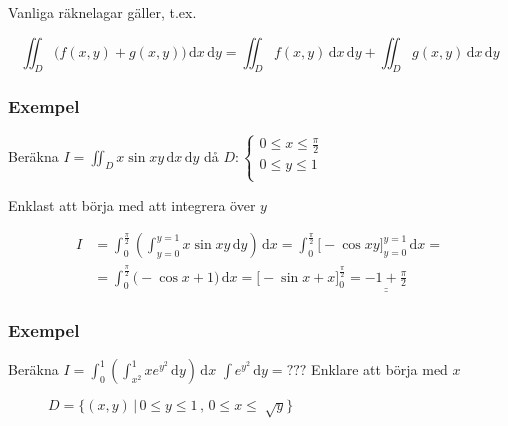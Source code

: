 \documentclass[a4paper]{article}
\newcommand{\svar}[1]{\underline{\underline{#1}}}
\let\oldsqrt\sqrt
\renewcommand*{\sqrt}[2][\ ]{\oldsqrt[#1]{#2} }
\begin{document}
Vanliga räknelagar gäller, t.ex.

$$
	\iint_D \Big(f(x,y)+g(x,y)\Big) \,\mathrm{d}x\,\mathrm{d}y = \iint_D f(x,y) \,\mathrm{d}x\,\mathrm{d}y + \iint_D g(x,y) \,\mathrm{d}x\,\mathrm{d}y
$$

\newpage
\subsubsection{Exempel}
Beräkna $I = \iint_D x\sin{xy} \,\mathrm{d}x\,\mathrm{d}y$   då $D:
\begin{cases}
	0 \leq x \leq \frac{\pi}{2} \\
	0 \leq y \leq 1 \\
\end{cases}$

Enklast att börja med att integrera över $y$

\begin{align*}
	I &= \int_0^{\frac{\pi}{2}} \left(\int_{y=0}^{y=1} x\sin{xy} \,\mathrm{d}y \right) \,\mathrm{d}x = \int_0^{\frac{\pi}{2}} \Bigg[ -\cos{xy} \Bigg]_{y=0}^{y=1} \,\mathrm{d}x = \\
	  &= \int_0^{\frac{\pi}{2}} \Bigg( -\cos{x} + 1 \Bigg) \,\mathrm{d}x = \Bigg[ -\sin{x} + x \Bigg]_0^{\frac{\pi}{2}} = \svar{-1 + \frac{\pi}{2}}
\end{align*}

\subsubsection{Exempel}
Beräkna $I = \int_0^1 \left( \int_{x^2}^1 xe^{y^2} \,\mathrm{d}y \right) \,\mathrm{d}x$  \newline
 $\int e^{y^2} \,\mathrm{d}y = ???$ Enklare att börja med $x$

\begin{figure}[ht]
  \caption{$D=\{(x,y) \, | \, 0 \leq y \leq 1 \,,\, 0 \leq x \leq \sqrt{y}\}$} \label{fig:9.4}
\end{figure}
\end{document}
